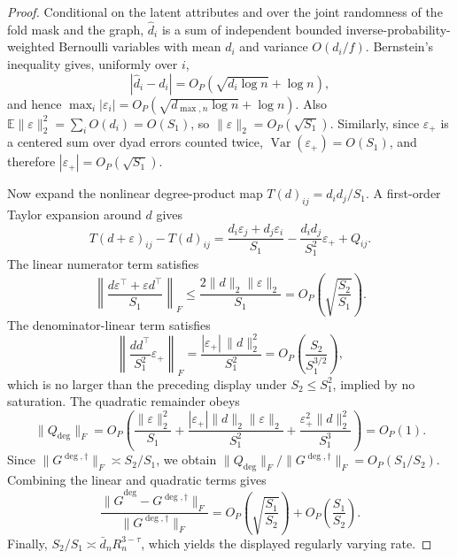 \documentclass[12pt]{article}
\newcommand{\1}{\mathbf{1}}
\begin{document}
\begin{proof}
Conditional on the latent attributes and over the joint randomness of the
fold mask and the graph, \(\widehat d_i\) is a sum of independent bounded
inverse-probability-weighted Bernoulli variables with mean \(d_i\) and
variance \(O(d_i/f)\). Bernstein's inequality gives, uniformly over \(i\),
\[
    |\widehat d_i-d_i|
    =
    O_P\!\left(\sqrt{d_i\log n}+\log n\right),
\]
and hence \(\max_i|\varepsilon_i|=O_P(\sqrt{d_{\max,n}\log n}+\log n)\).
Also \(\mathbb E\|\varepsilon\|_2^2=\sum_i O(d_i)=O(S_1)\), so
\(\|\varepsilon\|_2=O_P(\sqrt{S_1})\). Similarly, since \(\varepsilon_+\) is a
centered sum over dyad errors counted twice,
\(\operatorname{Var}(\varepsilon_+)=O(S_1)\), and therefore
\(|\varepsilon_+|=O_P(\sqrt{S_1})\).

Now expand the nonlinear degree-product map \(T(d)_{ij}=d_i d_j/S_1\). A
first-order Taylor expansion around \(d\) gives
\[
    T(d+\varepsilon)_{ij}-T(d)_{ij}
    =
    \frac{d_i\varepsilon_j+d_j\varepsilon_i}{S_1}
    -
    \frac{d_i d_j}{S_1^2}\varepsilon_+
    +
    Q_{ij}.
\]
The linear numerator term satisfies
\[
    \left\|
        \frac{d\varepsilon^\top+\varepsilon d^\top}{S_1}
    \right\|_F
    \le
    \frac{2\|d\|_2\|\varepsilon\|_2}{S_1}
    =
    O_P\!\left(\sqrt{\frac{S_2}{S_1}}\right).
\]
The denominator-linear term satisfies
\[
    \left\|
        \frac{d d^\top}{S_1^2}\varepsilon_+
    \right\|_F
    =
    \frac{|\varepsilon_+|\,\|d\|_2^2}{S_1^2}
    =
    O_P\!\left(\frac{S_2}{S_1^{3/2}}\right),
\]
which is no larger than the preceding display under \(S_2\le S_1^2\), implied
by no saturation. The quadratic remainder obeys
\[
    \|Q_{\deg}\|_F
    =
    O_P\!\left(
        \frac{\|\varepsilon\|_2^2}{S_1}
        +
        \frac{|\varepsilon_+|\|d\|_2\|\varepsilon\|_2}{S_1^2}
        +
        \frac{\varepsilon_+^2\|d\|_2^2}{S_1^3}
    \right)
    =
    O_P(1).
\]
Since \(\|G^{\deg,\dagger}\|_F\asymp S_2/S_1\), we obtain
\(\|Q_{\deg}\|_F/\|G^{\deg,\dagger}\|_F=O_P(S_1/S_2)\). Combining the linear and
quadratic terms gives
\[
    \frac{\|\widehat G^{\deg}-G^{\deg,\dagger}\|_F}
         {\|G^{\deg,\dagger}\|_F}
    =
    O_P\!\left(\sqrt{\frac{S_1}{S_2}}\right)
    +
    O_P\!\left(\frac{S_1}{S_2}\right).
\]
Finally, \(S_2/S_1\asymp\bar d_nR_n^{3-\tau}\), which yields the displayed
regularly varying rate.
\end{proof}
\end{document}
